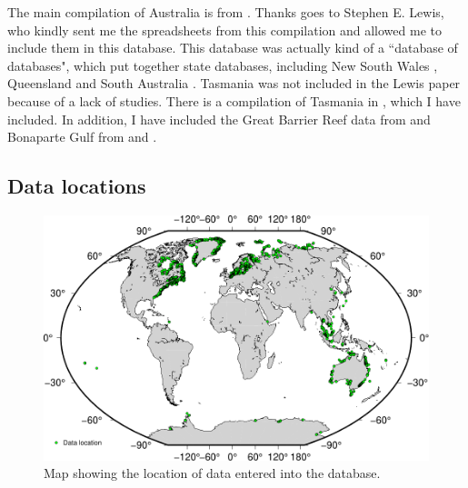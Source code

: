 The main compilation of Australia is from \citet{LewisEtal2013}. Thanks goes to Stephen E. Lewis, who kindly sent me the spreadsheets from this compilation and allowed me to include them in this database. This database was actually kind of a ``database of databases", which put together state databases, including New South Wales \citep{SlossEtal2007}, Queensland \citep{LarcombeEtal1995} and South Australia \citep{BelperioEtal2002}. Tasmania was not included in the Lewis paper because of a lack of studies. There is a compilation of Tasmania in \citet{Morrison2019}, which I have included. In addition, I have included the Great Barrier Reef data from \citet{YokoyamaEtal2018} and Bonaparte Gulf from \citet{YokoyamaEtal2000} and \citet{IshiwaEtal2019}.

\clearpage

\subsection{Data locations}

\begin{figure}[h]
\includegraphics[width=\textwidth]{../GIS/data_map.pdf}
\caption{Map showing the location of data entered into the database.}
\label{fig:data_map}
\end{figure}

\clearpage
